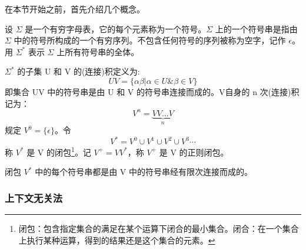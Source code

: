 在本节开始之前，首先介绍几个概念。

设 $\Sigma$ 是一个有穷字母表，它的每个元素称为一个符号。$\Sigma$ 上的一个符号串是指由 $\Sigma$ 中的符号所构成的一个有穷序列。不包含任何符号的序列被称为空字，记作 $\epsilon$。用 $\Sigma^*$ 表示 $\Sigma$ 上所有符号串的全体。

$\Sigma^*$ 的子集 U 和 V 的(连接)积定义为:
\[ UV = \{\alpha\beta | \alpha \in U \& \beta \in V\} \]
即集合 UV 中的符号串是由 U 和 V 的符号串连接而成的。V自身的 n 次(连接)积记为：
\[ V^n = \underbrace{VV...V}_{n} \]
规定 $V^0 = \{\epsilon\}$。令
\[ V^* = V^0 \cup V^1 \cup V^2 \cup V^3 \cdots \]
称 $V^{*}$ 是 V 的闭包\footnote{闭包：包含指定集合的满足在某个运算下闭合的最小集合。闭合：在一个集合上执行某种运算，得到的结果还是这个集合的元素。}。记 $V^+ = VV^*$，称 $V^+$ 是 V 的正则闭包。

闭包 $V^*$ 中的每个符号串都是由 V 中的符号串经有限次连接而成的。

\subsubsection{上下文无关法}

